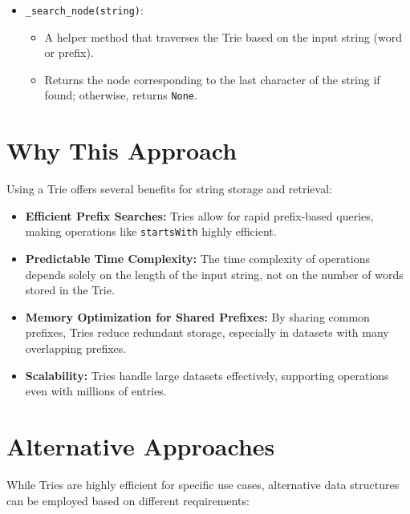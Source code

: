 \begin{itemize}
\begin{itemize}
        \item \texttt{\_search\_node(string)}:
        \begin{itemize}
            \item A helper method that traverses the Trie based on the input string (word or prefix).
            \item Returns the node corresponding to the last character of the string if found; otherwise, returns \texttt{None}.
        \end{itemize}
    \end{itemize}
\end{itemize}

\section*{Why This Approach}

Using a Trie offers several benefits for string storage and retrieval:

\begin{itemize}
    \item \textbf{Efficient Prefix Searches:} Tries allow for rapid prefix-based queries, making operations like \texttt{startsWith} highly efficient.
    
    \item \textbf{Predictable Time Complexity:} The time complexity of operations depends solely on the length of the input string, not on the number of words stored in the Trie.
    
    \item \textbf{Memory Optimization for Shared Prefixes:} By sharing common prefixes, Tries reduce redundant storage, especially in datasets with many overlapping prefixes.
    
    \item \textbf{Scalability:} Tries handle large datasets effectively, supporting operations even with millions of entries.
\end{itemize}

\section*{Alternative Approaches}

While Tries are highly efficient for specific use cases, alternative data structures can be employed based on different requirements:

